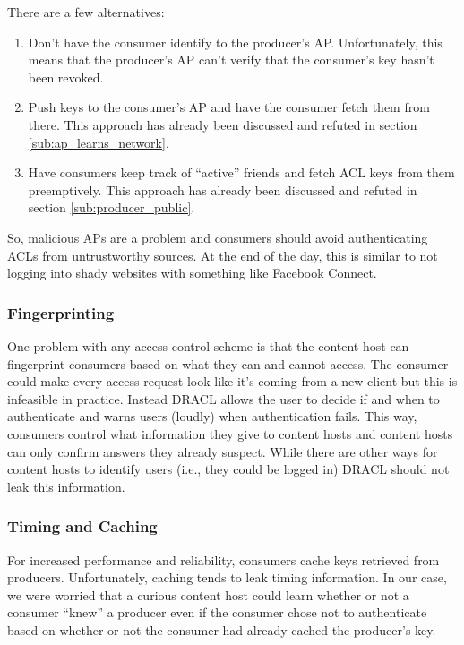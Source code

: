 \documentclass[pdftex,12pt,a4papaer,twoside,notitlepage]{report}
\begin{document}
There are a few alternatives:

\begin{enumerate}
\item Don't have the consumer identify to the producer's AP. Unfortunately, this
  means that the producer's AP can't verify that the consumer's key hasn't been
  revoked.
\item Push keys to the consumer's AP and have the consumer fetch them from
  there. This approach has already been discussed and refuted in section
  \ref{sub:ap_learns_network}.
\item Have consumers keep track of ``active'' friends and fetch ACL keys from
  them preemptively. This approach has already been discussed and refuted in
  section \ref{sub:producer_public}.
\end{enumerate}

So, malicious APs are a problem and consumers should avoid authenticating ACLs
from untrustworthy sources. At the end of the day, this is similar to not
logging into shady websites with something like Facebook Connect.

\subsubsection{Fingerprinting}
\label{sub:fingerprinting}

One problem with any access control scheme is that the content host can
fingerprint consumers based on what they can and cannot access. The consumer
could make every access request look like it's coming from a new client but this
is infeasible in practice. Instead DRACL allows the user to decide if and when
to authenticate and warns users (loudly) when authentication fails. This way,
consumers control what information they give to content hosts and content hosts
can only confirm answers they already suspect. While there are other ways for
content hosts to identify users (i.e., they could be logged in) DRACL should not
leak this information.

\subsubsection{Timing and Caching}
\label{sub:timing}

For increased performance and reliability, consumers cache keys retrieved from
producers. Unfortunately, caching tends to leak timing information. In our
case, we were worried that a curious content host could learn whether or not a
consumer ``knew'' a producer even if the consumer chose not to authenticate
based on whether or not the consumer had already cached the producer's key.
\end{document}
